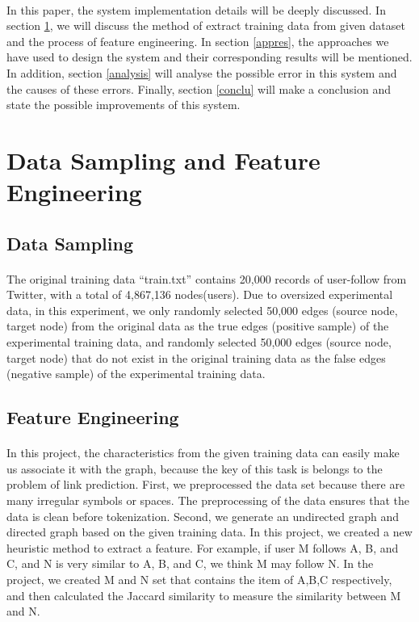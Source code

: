 \documentclass[fleqn,11pt]{olplainarticle}
\begin{document}
\paragraph*{}
In this paper, the system implementation details will be deeply discussed. In section \ref{datafeature}, we will discuss the method of extract training data from given dataset and the process of feature engineering. In section \ref{appres}, the approaches we have used to design the system and their corresponding results will be mentioned. In addition, section \ref{analysis} will analyse the possible error in this system and the causes of these errors. Finally, section \ref{conclu} will make a conclusion and state the possible improvements of this system.



\section{Data Sampling and Feature Engineering}\label{datafeature}

\subsection{Data Sampling}\label{data}
\paragraph*{}
The original training data “train.txt” contains 20,000 records of user-follow from Twitter, with a total of 4,867,136 nodes(users). Due to oversized experimental data, in this experiment, we only randomly selected 50,000 edges (source node, target node) from the original data as the true edges (positive sample) of the experimental training data, and randomly selected 50,000 edges (source node, target node)  that do not exist in the original training data as the false edges (negative sample) of the experimental training data. 

\subsection{Feature Engineering}\label{feature}
\paragraph*{}
In this project, the characteristics from the given training data can easily make us associate it with the graph, because the key of this task is belongs to the problem of link prediction. First, we preprocessed the data set because there are many irregular symbols or spaces. The preprocessing of the data ensures that the data is clean before tokenization. Second, we generate an undirected graph and directed graph based on the given training data. In this project, we created a new heuristic method to extract a feature. For example, if user M follows A, B, and C, and N is very similar to A, B, and C, we think M may follow N. In the project, we created M and N set that contains the item of A,B,C respectively, and then calculated the Jaccard similarity to measure the similarity between M and N.
\end{document}
